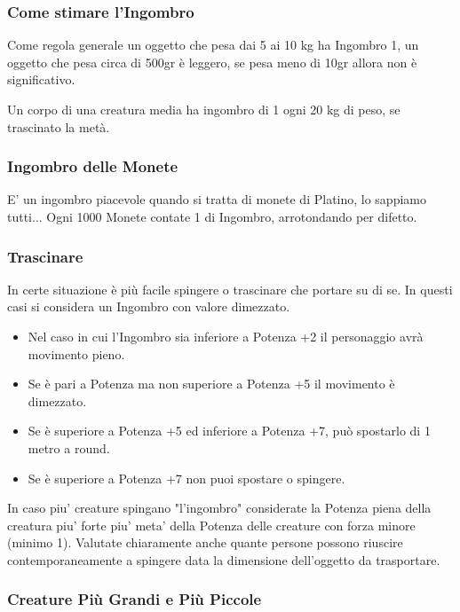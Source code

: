 \documentclass[a4paper,11pt,twoside,openany]{book}
\begin{document}
\subsubsection{Come stimare l'Ingombro}

Come regola generale un oggetto che pesa dai 5 ai 10 kg ha Ingombro 1, un oggetto che pesa circa di 500gr è leggero, se pesa meno di 10gr allora non è significativo.

Un corpo di una creatura media ha ingombro di 1 ogni 20 kg di peso, se trascinato la metà.

\subsubsection{Ingombro delle Monete}

E' un ingombro piacevole quando si tratta di monete di Platino, lo sappiamo tutti...
Ogni 1000 Monete contate 1 di Ingombro, arrotondando per difetto.


\subsubsection{Trascinare}

In certe situazione è più facile spingere o trascinare che portare su di se.
In questi casi si considera un Ingombro con valore dimezzato.

\begin{itemize}
	\item Nel caso in cui l'Ingombro sia inferiore a Potenza +2 il personaggio avrà movimento pieno.

	\item Se è pari a Potenza ma non superiore a Potenza +5 il movimento è dimezzato.

	\item Se è superiore a Potenza +5 ed inferiore a Potenza +7, può spostarlo di 1 metro a round.

	\item Se è superiore a Potenza +7 non puoi spostare o spingere.
\end{itemize}

In caso piu' creature spingano "l'ingombro" considerate la Potenza piena della creatura piu' forte piu' meta' della Potenza delle creature con forza minore (minimo 1). Valutate chiaramente anche quante persone possono riuscire contemporaneamente a spingere data la dimensione dell'oggetto da trasportare.

\subsubsection{Creature Più Grandi e Più Piccole}
\end{document}
